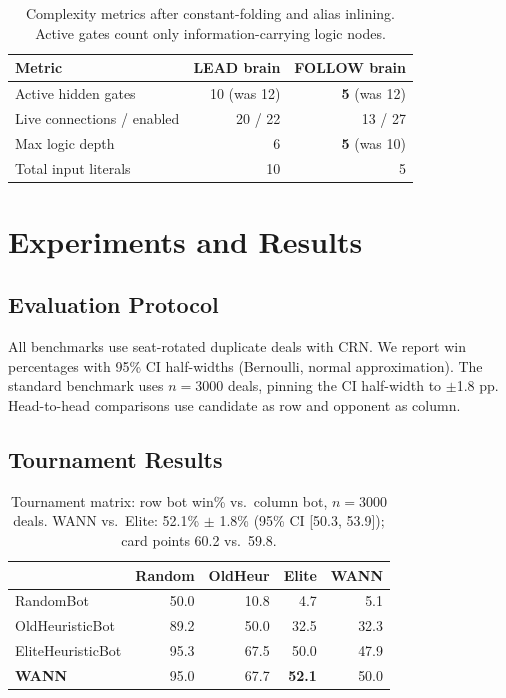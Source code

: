 \documentclass[runningheads]{llncs}
\begin{document}
\begin{table}[t]
\centering
\caption{Complexity metrics after constant-folding and alias inlining. Active
gates count only information-carrying logic nodes.}
\label{tab:complexity}
\begin{tabular}{lrr}
\toprule
\textbf{Metric} & \textbf{LEAD brain} & \textbf{FOLLOW brain} \\
\midrule
Active hidden gates          & 10 (was 12) & \textbf{5} (was 12) \\
Live connections / enabled   & 20 / 22     & 13 / 27 \\
Max logic depth              & 6           & \textbf{5} (was 10) \\
Total input literals         & 10          & 5 \\
\bottomrule
\end{tabular}
\end{table}

\section{Experiments and Results}\label{sec:results}

\subsection{Evaluation Protocol}

All benchmarks use seat-rotated duplicate deals with CRN. We report win
percentages with 95\% CI half-widths (Bernoulli, normal approximation). The
standard benchmark uses $n = 3000$ deals, pinning the CI half-width to $\pm$1.8
pp. Head-to-head comparisons use candidate as row and opponent as column.

\subsection{Tournament Results}

\begin{table}[t]
\centering
\caption{Tournament matrix: row bot win\% vs.\ column bot, $n = 3000$ deals.
WANN vs.\ Elite: 52.1\% $\pm$ 1.8\% (95\% CI [50.3, 53.9]); card points 60.2
vs.\ 59.8.}
\label{tab:tournament}
\begin{tabular}{lrrrr}
\toprule
& \textbf{Random} & \textbf{OldHeur} & \textbf{Elite} & \textbf{WANN} \\
\midrule
RandomBot        & 50.0 & 10.8 & 4.7  & 5.1  \\
OldHeuristicBot  & 89.2 & 50.0 & 32.5 & 32.3 \\
EliteHeuristicBot& 95.3 & 67.5 & 50.0 & 47.9 \\
\textbf{WANN}    & 95.0 & 67.7 & \textbf{52.1} & 50.0 \\
\bottomrule
\end{tabular}
\end{table}
\end{document}
